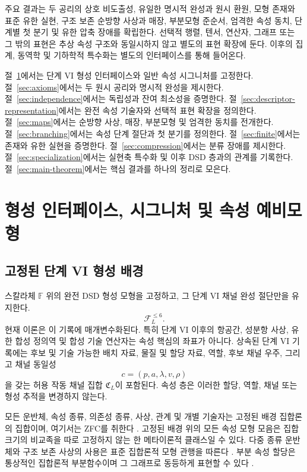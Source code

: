 \documentclass[11pt]{article}
\newcommand{\FVI}{\mathcal F_{L}^{\le 6}}
\theoremstyle{definition}
\theoremstyle{remark}
\begin{document}
주요 결과는 두 공리의 상호 비도출성, 유일한 명시적 완성과 원시 환원, 모형 존재와 표준 유한 실현, 구조 보존 순방향 사상과 매장, 부분모형 준순서, 엄격한 속성 동치, 단계별 첫 분기 및 유한 압축 장애를 확립한다.
선택적 행렬, 텐서, 연산자, 그래프 또는 그 밖의 표현은 추상 속성 구조와 동일시하지 않고 별도의 표현 확장에 둔다.
이후의 집계, 동역학 및 기하학적 특수화는 별도의 인터페이스를 통해 들어온다.

절~\ref{sec:formal-setting}에서는 단계 VI 형성 인터페이스와 일반 속성 시그니처를 고정한다.
절~\ref{sec:axioms}에서는 두 원시 공리와 명시적 완성을 제시한다.
절~\ref{sec:independence}에서는 독립성과 잔여 최소성을 증명한다.
절~\ref{sec:descriptor-representation}에서는 완전 속성 기술자와 선택적 표현 확장을 정의한다.
절~\ref{sec:maps}에서는 순방향 사상, 매장, 부분모형 및 엄격한 동치를 전개한다.
절~\ref{sec:branching}에서는 속성 단계 절단과 첫 분기를 정의한다.
절~\ref{sec:finite}에서는 존재와 유한 실현을 증명한다.
절~\ref{sec:compression}에서는 분류 장애를 제시한다.
절~\ref{sec:specialization}에서는 실현축 특수화 및 이후 DSD 층과의 관계를 기록한다.
절~\ref{sec:main-theorem}에서는 핵심 결과를 하나의 정리로 모은다.

\section{형성 인터페이스, 시그니처 및 속성 예비모형}
\label{sec:formal-setting}

\subsection{고정된 단계 VI 형성 배경}

스칼라체 \(\mathbb F\) 위의 완전 DSD 형성 모형을 고정하고, 그 단계 VI 채널 완성 절단만을 유지한다.
\[
\FVI.
\]
현재 이론은 이 기록에 매개변수화된다.
특히 단계 VI 이후의 항공간, 성분항 사상, 유한 합성 정의역 및 합성 기술 연산자는 속성 핵심의 좌표가 아니다.
상속된 단계 VI 기록에는 후보 및 기술 가능한 배치 자료, 물질 및 할당 자료, 역할, 후보 채널 우주, 그리고 채널 동일성
\[
c=(p,a,\lambda,v,\rho)
\]
을 갖는 허용 작동 채널 집합 \(\mathfrak C_L\)이 포함된다.
속성 층은 이러한 할당, 역할, 채널 또는 형성 추적을 변경하지 않는다.

모든 운반체, 속성 종류, 의존성 종류, 사상, 관계 및 개별 기술자는 고정된 배경 집합론의 집합이며, 여기서는 ZFC를 취한다 \cite{JechSetTheory}.
고정된 배경 위의 모든 속성 모형 모음은 집합 크기의 비교족을 따로 고정하지 않는 한 메타이론적 클래스일 수 있다.
다중 종류 운반체와 구조 보존 사상의 사용은 표준 집합론적 모형 관행을 따른다 \cite{HodgesModelTheory}. 부분 속성 할당은 통상적인 집합론적 부분함수이며 그 그래프로 동등하게 표현할 수 있다 \cite{FarmerPartial}.
\end{document}
